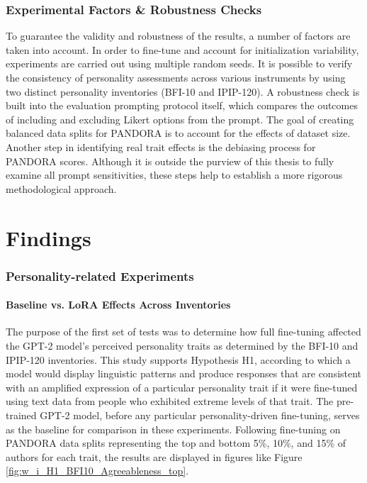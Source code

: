 \documentclass{DESSThesis}
\begin{document}
\subsection{Experimental Factors \& Robustness Checks}
To guarantee the validity and robustness of the results, a number of factors are taken into account. In order to fine-tune and account for initialization variability, experiments are carried out using multiple random seeds. It is possible to verify the consistency of personality assessments across various instruments by using two distinct personality inventories (BFI-10 and IPIP-120). A robustness check is built into the evaluation prompting protocol itself, which compares the outcomes of including and excluding Likert options from the prompt. The goal of creating balanced data splits for PANDORA is to account for the effects of dataset size. Another step in identifying real trait effects is the debiasing process for PANDORA scores. Although it is outside the purview of this thesis to fully examine all prompt sensitivities, these steps help to establish a more rigorous methodological approach.


\chapter{Findings}
\thispagestyle{empty}

\subsection{Personality-related Experiments}
\subsubsection{Baseline vs. LoRA Effects Across Inventories}
The purpose of the first set of tests was to determine how full fine-tuning affected the GPT-2 model's perceived personality traits as determined by the BFI-10 and IPIP-120 inventories. This study supports Hypothesis H1, according to which a model would display linguistic patterns and produce responses that are consistent with an amplified expression of a particular personality trait if it were fine-tuned using text data from people who exhibited extreme levels of that trait. The pre-trained GPT-2 model, before any particular personality-driven fine-tuning, serves as the baseline for comparison in these experiments. Following fine-tuning on PANDORA data splits representing the top and bottom 5\%, 10\%, and 15\% of authors for each trait, the results are displayed in figures like Figure \ref{fig:w_i_H1_BFI10_Agreeableness_top}.
\end{document}
